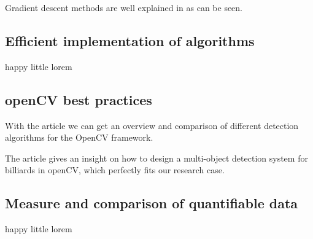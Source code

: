 \documentclass[titlepage, a4paper, 11pt]{scrartcl}
\begin{document}
Gradient descent methods are well explained in \citep{ruder2016overview} as can be seen.

\subsection{Efficient  implementation  of  algorithms}

happy little lorem

\subsection{openCV best practices}

With the article \citep{janku2016comparison} we can get an overview and comparison of different detection algorithms for the OpenCV framework.

The article \citep{gao2018design} gives an insight on how to design a multi-object detection system for billiards in openCV, which perfectly fits our research case.

\subsection{Measure and comparison of quantifiable data}

happy little lorem

 

\end{document}
